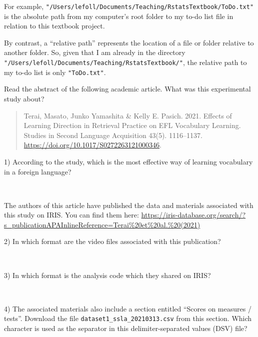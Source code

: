 \documentclass[
  letterpaper,
  DIV=11,
  numbers=noendperiod]{scrreprt}
\begin{document}
For example,
\texttt{"/Users/lefoll/Documents/Teaching/RstatsTextbook/ToDo.txt"} is
the absolute path from my computer's root folder to my to-do list file
in relation to this textbook project.

By contrast, a ``relative path'' represents the location of a file or
folder relative to another folder. So, given that I am already in the
directory \texttt{"/Users/lefoll/Documents/Teaching/RstatsTextbook/"},
the relative path to my to-do list is only \texttt{"ToDo.txt"}.

\begin{tcolorbox}[enhanced jigsaw, opacityback=0, bottomrule=.15mm, left=2mm, coltitle=black, bottomtitle=1mm, opacitybacktitle=0.6, leftrule=.75mm, arc=.35mm, breakable, toptitle=1mm, colframe=quarto-callout-caution-color-frame, colback=white, titlerule=0mm, colbacktitle=quarto-callout-caution-color!10!white, title=\textcolor{quarto-callout-caution-color}{\faFire}\hspace{0.5em}{Task}, rightrule=.15mm, toprule=.15mm]

Read the abstract of the following academic article. What was this
experimental study about?

\begin{quote}
Terai, Masato, Junko Yamashita \& Kelly E. Pasich. 2021. Effects of
Learning Direction in Retrieval Practice on EFL Vocabulary Learning.
Studies in Second Language Acquisition 43(5). 1116--1137.
\url{https://doi.org/10.1017/S0272263121000346}.
\end{quote}

1) According to the study, which is the most effective way of learning
vocabulary in a foreign language?

~

The authors of this article have published the data and materials
associated with this study on IRIS. You can find them here:
\url{https://iris-database.org/search/?s_publicationAPAInlineReference=Terai\%20et\%20al.\%20(2021)}

2) In which format are the video files associated with this publication?

~

3) In which format is the analysis code which they shared on IRIS?

~

4) The associated materials also include a section entitled ``Scores on
measures / tests''. Download the file
\texttt{dataset1\_ssla\_20210313.csv} from this section. Which character
is used as the separator in this delimiter-separated values (DSV) file?

\end{tcolorbox}
\end{document}
